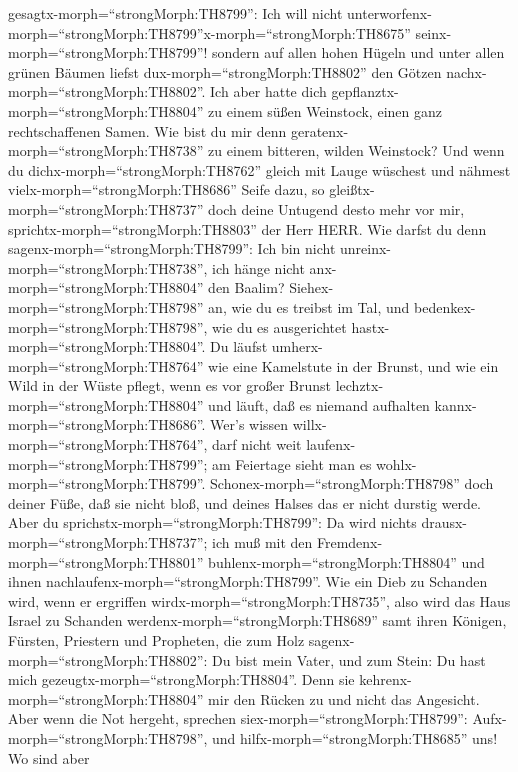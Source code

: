 gesagtx-morph=``strongMorph:TH8799'': Ich will nicht
unterworfenx-morph=``strongMorph:TH8799''\textbar x-morph=``strongMorph:TH8675''
seinx-morph=``strongMorph:TH8799''! sondern auf allen hohen Hügeln und
unter allen grünen Bäumen liefst dux-morph=``strongMorph:TH8802'' den
Götzen nachx-morph=``strongMorph:TH8802''.  Ich aber hatte
dich gepflanztx-morph=``strongMorph:TH8804'' zu einem süßen Weinstock,
einen ganz rechtschaffenen Samen. Wie bist du mir denn
geratenx-morph=``strongMorph:TH8738'' zu einem bitteren, wilden
Weinstock?  Und wenn du dichx-morph=``strongMorph:TH8762''
gleich mit Lauge wüschest und nähmest vielx-morph=``strongMorph:TH8686''
Seife dazu, so gleißtx-morph=``strongMorph:TH8737'' doch deine Untugend
desto mehr vor mir, sprichtx-morph=``strongMorph:TH8803'' der Herr HERR.
 Wie darfst du denn sagenx-morph=``strongMorph:TH8799'':
Ich bin nicht unreinx-morph=``strongMorph:TH8738'', ich hänge nicht
anx-morph=``strongMorph:TH8804'' den Baalim?
Siehex-morph=``strongMorph:TH8798'' an, wie du es treibst im Tal, und
bedenkex-morph=``strongMorph:TH8798'', wie du es ausgerichtet
hastx-morph=``strongMorph:TH8804''.  Du läufst
umherx-morph=``strongMorph:TH8764'' wie eine Kamelstute in der Brunst,
und wie ein Wild in der Wüste pflegt, wenn es vor großer Brunst
lechztx-morph=``strongMorph:TH8804'' und läuft, daß es niemand aufhalten
kannx-morph=``strongMorph:TH8686''. Wer's wissen
willx-morph=``strongMorph:TH8764'', darf nicht weit
laufenx-morph=``strongMorph:TH8799''; am Feiertage sieht man es
wohlx-morph=``strongMorph:TH8799''. 
Schonex-morph=``strongMorph:TH8798'' doch deiner Füße, daß sie nicht
bloß, und deines Halses das er nicht durstig werde. Aber du
sprichstx-morph=``strongMorph:TH8799'': Da wird nichts
drausx-morph=``strongMorph:TH8737''; ich muß mit den
Fremdenx-morph=``strongMorph:TH8801''
buhlenx-morph=``strongMorph:TH8804'' und ihnen
nachlaufenx-morph=``strongMorph:TH8799''.  Wie ein Dieb zu
Schanden wird, wenn er ergriffen wirdx-morph=``strongMorph:TH8735'',
also wird das Haus Israel zu Schanden
werdenx-morph=``strongMorph:TH8689'' samt ihren Königen, Fürsten,
Priestern und Propheten,  die zum Holz
sagenx-morph=``strongMorph:TH8802'': Du bist mein Vater, und zum Stein:
Du hast mich gezeugtx-morph=``strongMorph:TH8804''. Denn sie
kehrenx-morph=``strongMorph:TH8804'' mir den Rücken zu und nicht das
Angesicht. Aber wenn die Not hergeht, sprechen
siex-morph=``strongMorph:TH8799'': Aufx-morph=``strongMorph:TH8798'',
und hilfx-morph=``strongMorph:TH8685'' uns!  Wo sind aber
